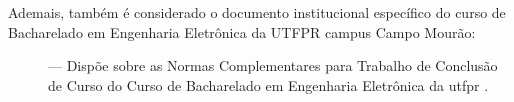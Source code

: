 Ademais, também é considerado o documento institucional específico do curso de Bacharelado em Engenharia Eletrônica da UTFPR campus Campo Mourão:
\begin{description}
	\item[] --- Dispõe sobre as Normas Complementares para Trabalho de Conclusão de Curso do Curso de Bacharelado em Engenharia Eletrônica da \ac{utfpr} \cite{coele2023}.
\end{description}
